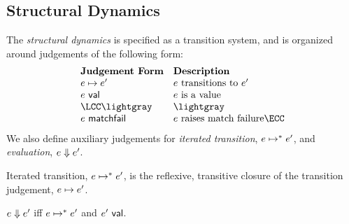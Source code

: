 
\subsection{Structural Dynamics}\vspace{-4px}
The \emph{structural dynamics} is specified as a transition system, and is organized around judgements of the following form:
\vspace{-4px}\[\begin{array}{ll}
\textbf{Judgement Form} & \textbf{Description}\\
\stepsU{e}{e'} & \text{$e$ transitions to $e'$}\\
\isvalU{e} & \text{$e$ is a value}\\
\LCC \lightgray & \lightgray \\
\matchfail{e} & \text{$e$ raises match failure} \ECC
\end{array}\]\vspace{-4px}
We also define auxiliary judgements for \emph{iterated transition}, $e \mapsto^{*} e'$, and \emph{evaluation}, $e \Downarrow e'$.


\begin{definition}\label{defn:iterated-transition-UP} Iterated transition, $e \mapsto^{*} e'$, is the reflexive, transitive closure of the transition judgement, $e \mapsto e'$.\end{definition}


\begin{definition}[Evaluation]\label{defn:evaluation-UP}  $e \Downarrow e'$ iff $e \mapsto^{*} e'$ and $e'~\mathsf{val}$. \end{definition}

